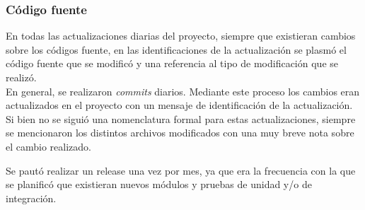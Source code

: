 \subsubsection*{C\'odigo fuente}
En todas las actualizaciones diarias del proyecto, siempre que existieran cambios sobre los c\'odigos fuente, en las identificaciones de la actualizaci\'on se plasm\'o el c\'odigo fuente que se modific\'o y una referencia al tipo de modificaci\'on que se realiz\'o.\\


En general, se realizaron {\it{commits}} diarios. Mediante este proceso los cambios eran actualizados en el proyecto con un mensaje de identificaci\'on de la actualizaci\'on. Si bien no se sigui\'o una nomenclatura formal para estas actualizaciones, siempre se mencionaron los distintos archivos modificados con una muy breve nota sobre el cambio realizado.  

Se paut\'o realizar un release una vez por mes, ya que era la frecuencia con la que se planific\'o que existieran nuevos m\'odulos y pruebas de unidad y/o de integraci\'on. 

